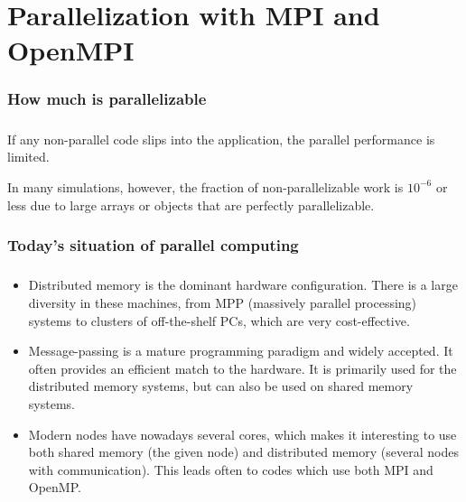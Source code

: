 \chapter{Parallelization with MPI and OpenMPI}

\subsection*{How much is parallelizable}

\paragraph{}
If any non-parallel code slips into the
application, the parallel
performance is limited. 

In many simulations, however, the fraction of non-parallelizable work
is $10^{-6}$ or less due to large arrays or objects that are perfectly parallelizable.



\subsection*{Today's situation of parallel computing}

\paragraph{}

\begin{itemize}
\item Distributed memory is the dominant hardware configuration. There is a large diversity in these machines, from  MPP (massively parallel processing) systems to clusters of off-the-shelf PCs, which are very cost-effective.

\item Message-passing is a mature programming paradigm and widely accepted. It often provides an efficient match to the hardware. It is primarily used for the distributed memory systems, but can also be used on shared memory systems.

\item Modern nodes have nowadays several cores, which makes it interesting to use both shared memory (the given node) and distributed memory (several nodes with communication). This leads often to codes which use both MPI and OpenMP.
\end{itemize}

